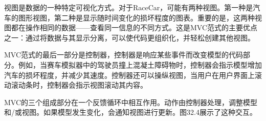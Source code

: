 视图是数据的一种特定可视化方式。对于RaceCar，可能有两种视图。第一种是汽车的图形视图，第二种是显示随时间变化的损坏程度的图表。重要的是，这两种视图都在操作相同的数据——查看同一信息的不同方式。这是MVC范式的主要优点之一：通过将数据与其显示分离，可以使代码更组织化，并轻松创建其他视图。

MVC范式的最后一部分是控制器，控制器是响应某些事件而改变模型的代码部分。例如，当赛车模拟器中的驾驶员撞上混凝土障碍物时，控制器会指示模型增加汽车的损坏程度，并减少其速度。控制器还可以操纵视图，当用户在用户界面上滚动滚动条时，控制器会指示视图滚动其内容。

MVC的三个组成部分在一个反馈循环中相互作用。动作由控制器处理，调整模型和/或视图。如果模型发生变化，会通知视图进行更新。图32.4展示了这种交互。












